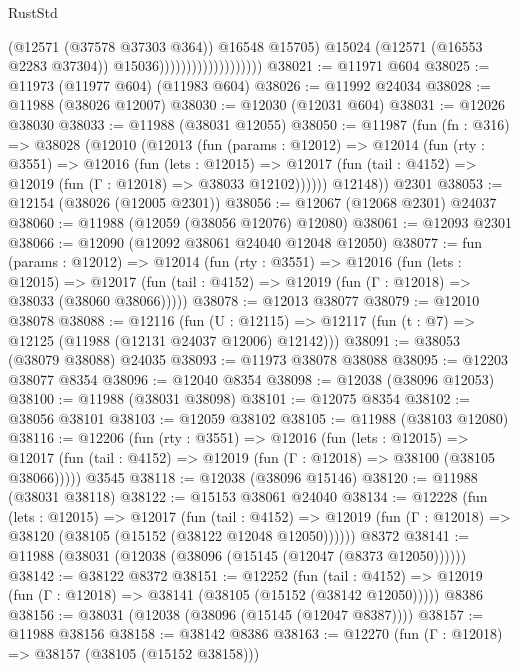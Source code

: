 \begin{lexlean}{RustStd}
\begin{coremodule}
                                            (@12571 (@37578 @37303 @364))
                                            @16548
                                            @15705)
                                          @15024
                                          (@12571 (@16553 @2283 @37304))
                                          @15036)))))))))))))))))))
@38021 := @11971 @604
@38025 := @11973 (@11977 @604) (@11983 @604)
@38026 := @11992 @24034
@38028 := @11988 (@38026 @12007)
@38030 := @12030 (@12031 @604)
@38031 := @12026 @38030
@38033 := @11988 (@38031 @12055)
@38050 := @11987
    (fun (fn : @316) =>
    @38028
      (@12010
        (@12013
          (fun (params : @12012) =>
          @12014
            (fun (rty : @3551) =>
            @12016
              (fun (lets : @12015) =>
              @12017 (fun (tail : @4152) => @12019 (fun (Γ : @12018) => @38033 @12102))))))
        @12148))
    @2301
@38053 := @12154 (@38026 (@12005 @2301))
@38056 := @12067 (@12068 @2301) @24037
@38060 := @11988 (@12059 (@38056 @12076) @12080)
@38061 := @12093 @2301
@38066 := @12090 (@12092 @38061 @24040 @12048 @12050)
@38077 := fun (params : @12012) =>
  @12014
    (fun (rty : @3551) =>
    @12016
      (fun (lets : @12015) =>
      @12017 (fun (tail : @4152) => @12019 (fun (Γ : @12018) => @38033 (@38060 @38066)))))
@38078 := @12013 @38077
@38079 := @12010 @38078
@38088 := @12116
    (fun (U : @12115) => @12117 (fun (t : @7) => @12125 (@11988 (@12131 @24037 @12006) @12142)))
@38091 := @38053 (@38079 @38088) @24035
@38093 := @11973 @38078 @38088
@38095 := @12203 @38077 @8354
@38096 := @12040 @8354
@38098 := @12038 (@38096 @12053)
@38100 := @11988 (@38031 @38098)
@38101 := @12075 @8354
@38102 := @38056 @38101
@38103 := @12059 @38102
@38105 := @11988 (@38103 @12080)
@38116 := @12206
    (fun (rty : @3551) =>
    @12016
      (fun (lets : @12015) =>
      @12017 (fun (tail : @4152) => @12019 (fun (Γ : @12018) => @38100 (@38105 @38066)))))
    @3545
@38118 := @12038 (@38096 @15146)
@38120 := @11988 (@38031 @38118)
@38122 := @15153 @38061 @24040
@38134 := @12228
    (fun (lets : @12015) =>
    @12017
      (fun (tail : @4152) =>
      @12019 (fun (Γ : @12018) => @38120 (@38105 (@15152 (@38122 @12048 @12050))))))
    @8372
@38141 := @11988 (@38031 (@12038 (@38096 (@15145 (@12047 (@8373 @12050))))))
@38142 := @38122 @8372
@38151 := @12252
    (fun (tail : @4152) => @12019 (fun (Γ : @12018) => @38141 (@38105 (@15152 (@38142 @12050)))))
    @8386
@38156 := @38031 (@12038 (@38096 (@15145 (@12047 @8387))))
@38157 := @11988 @38156
@38158 := @38142 @8386
@38163 := @12270 (fun (Γ : @12018) => @38157 (@38105 (@15152 @38158)))

\end{coremodule}
\end{lexlean}

